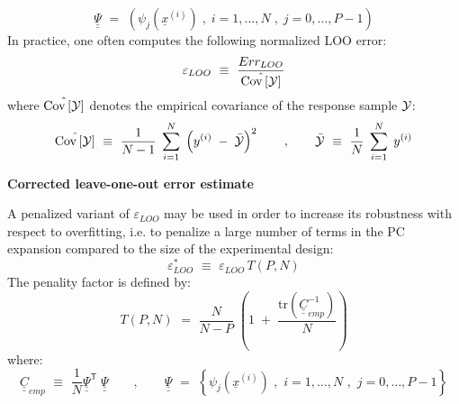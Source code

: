 {  \begin{equation} \label{eq:4.3:7bis}
    \underline{\underline{\Psi}} \, \, = \, \, (\psi_{j}(\underline{x}^{(i)}) \; , \; i=1,\dots,N \; , \; j = 0,\dots,P-1)
  \end{equation}
  In practice, one often computes the following normalized LOO error:
  \begin{equation} \label{eq:4.3:8bis}
    \varepsilon_{LOO} \, \, \equiv \, \, \frac{Err_{LOO}}{\hat{{\rm Cov}\left[ {\mathcal Y} \right]}}
  \end{equation}
  where $\hat{{\rm Cov}\left[ \mathcal{Y} \right]}$ denotes the empirical covariance of the response sample ${\mathcal Y}$:
  \begin{equation} \label{eq:4.3:4bis}
    \hat{{\rm Cov}\left[ \mathcal{Y} \right]} \, \, \equiv \, \, \frac{1}{N-1} \; \sum_{i=1}^{N} \; \left( y^{(i)} \; - \;   \bar{\mathcal{Y}}  \right)^{2} \quad  \quad , \quad \quad   \bar{\mathcal{Y}} \, \, \equiv \, \, \frac{1}{N} \; \sum_{i=1}^{N} \; y^{(i)}
  \end{equation}

  \textbf{Corrected leave-one-out error estimate} \vspace{2mm}

  A penalized variant of $\varepsilon_{LOO}$ may be used in order to increase its robustness with respect to overfitting, i.e. to penalize a large number of terms in the PC expansion compared to the size of the experimental design:
  \begin{equation}
    \varepsilon_{LOO}^{*} \, \, \equiv \, \, \varepsilon_{LOO} \, T(P,N)
  \end{equation}
  The penality factor is defined by:
  \begin{equation}
    T(P,N) \, \, = \, \,   \frac{N}{N-P}  \; \left(1 \; + \; \frac{\mbox{tr} \left( \underline{\underline{C}}_{emp}^{-1}  \right) }{N} \right)
  \end{equation}
  where:
  \begin{equation} \label{eq:4.3:10bis}
    \underline{\underline{C}}_{emp} \, \, \equiv \, \, \frac{1}{N}\underline{\underline{\Psi}}^{\textsf{T}}\; \underline{\underline{\Psi}} \quad \quad , \quad \quad
    \underline{\underline{\Psi}} \, \, = \, \, \left\{ \psi_{j}(\underline{x}^{(i)}) \, \, , \, \, i=1,\dots,N \, \, , \, \, j=0,\dots,P-1 \right\}
  \end{equation}
}

